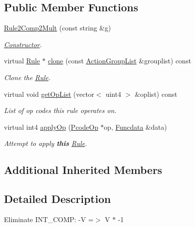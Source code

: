 \subsection*{Public Member Functions}
\begin{DoxyCompactItemize}
\item 
\mbox{\hyperlink{class_rule2_comp2_mult_a511ae7528464ac030c25acf15f24a93b}{Rule2\+Comp2\+Mult}} (const string \&g)
\begin{DoxyCompactList}\small\item\em \mbox{\hyperlink{class_constructor}{Constructor}}. \end{DoxyCompactList}\item 
virtual \mbox{\hyperlink{class_rule}{Rule}} $\ast$ \mbox{\hyperlink{class_rule2_comp2_mult_a6aff1bc6cd4214605512eb99150f09d5}{clone}} (const \mbox{\hyperlink{class_action_group_list}{Action\+Group\+List}} \&grouplist) const
\begin{DoxyCompactList}\small\item\em Clone the \mbox{\hyperlink{class_rule}{Rule}}. \end{DoxyCompactList}\item 
virtual void \mbox{\hyperlink{class_rule2_comp2_mult_a5c3433a75e8030cd60735e167acba88d}{get\+Op\+List}} (vector$<$ uint4 $>$ \&oplist) const
\begin{DoxyCompactList}\small\item\em List of op codes this rule operates on. \end{DoxyCompactList}\item 
virtual int4 \mbox{\hyperlink{class_rule2_comp2_mult_a1a526d775f62b172a92886444b5889a3}{apply\+Op}} (\mbox{\hyperlink{class_pcode_op}{Pcode\+Op}} $\ast$op, \mbox{\hyperlink{class_funcdata}{Funcdata}} \&data)
\begin{DoxyCompactList}\small\item\em Attempt to apply {\bfseries{this}} \mbox{\hyperlink{class_rule}{Rule}}. \end{DoxyCompactList}\end{DoxyCompactItemize}
\subsection*{Additional Inherited Members}


\subsection{Detailed Description}
Eliminate I\+N\+T\+\_\+C\+O\+MP\+: {\ttfamily -\/V =$>$ V $\ast$ -\/1} 

